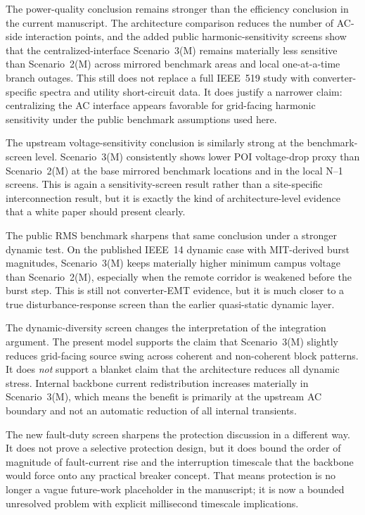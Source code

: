 \documentclass[11pt]{article}
\begin{document}
The power-quality conclusion remains stronger than the efficiency conclusion in the current manuscript. The architecture comparison reduces the number of AC-side interaction points, and the added public harmonic-sensitivity screens show that the centralized-interface Scenario~3(M) remains materially less sensitive than Scenario~2(M) across mirrored benchmark areas and local one-at-a-time branch outages. This still does not replace a full IEEE~519 study with converter-specific spectra and utility short-circuit data. It does justify a narrower claim: centralizing the AC interface appears favorable for grid-facing harmonic sensitivity under the public benchmark assumptions used here.

The upstream voltage-sensitivity conclusion is similarly strong at the benchmark-screen level. Scenario~3(M) consistently shows lower POI voltage-drop proxy than Scenario~2(M) at the base mirrored benchmark locations and in the local N--1 screens. This is again a sensitivity-screen result rather than a site-specific interconnection result, but it is exactly the kind of architecture-level evidence that a white paper should present clearly.

The public RMS benchmark sharpens that same conclusion under a stronger dynamic test. On the published IEEE~14 dynamic case with MIT-derived burst magnitudes, Scenario~3(M) keeps materially higher minimum campus voltage than Scenario~2(M), especially when the remote corridor is weakened before the burst step. This is still not converter-EMT evidence, but it is much closer to a true disturbance-response screen than the earlier quasi-static dynamic layer.

The dynamic-diversity screen changes the interpretation of the integration argument. The present model supports the claim that Scenario~3(M) slightly reduces grid-facing source swing across coherent and non-coherent block patterns. It does \emph{not} support a blanket claim that the architecture reduces all dynamic stress. Internal backbone current redistribution increases materially in Scenario~3(M), which means the benefit is primarily at the upstream AC boundary and not an automatic reduction of all internal transients.

The new fault-duty screen sharpens the protection discussion in a different way. It does not prove a selective protection design, but it does bound the order of magnitude of fault-current rise and the interruption timescale that the backbone would force onto any practical breaker concept. That means protection is no longer a vague future-work placeholder in the manuscript; it is now a bounded unresolved problem with explicit millisecond timescale implications.
\end{document}
